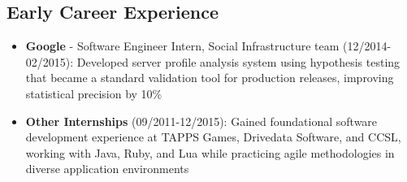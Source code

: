 
\subsection{Early Career Experience}
\begin{itemize}
    \item \small{\textbf{Google} - Software Engineer Intern, Social Infrastructure team} \footnotesize{(12/2014-02/2015): Developed server profile analysis system using hypothesis testing that became a standard validation tool for production releases, improving statistical precision by 10\%}

    \item \small{\textbf{Other Internships}}\footnotesize{ (09/2011-12/2015): Gained foundational software development experience at TAPPS Games, Drivedata Software, and CCSL, working with Java, Ruby, and Lua while practicing agile methodologies in diverse application environments}
\end{itemize}